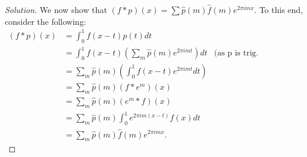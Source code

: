\begin{proof}[Solution]
We now show that  $(f* p) \left( x \right) = \sum \hat{p} \left( m \right) \hat{f}\left( m \right) e^{2\pi i m x}$. To this end, consider the following:
\begin{align*}
\left( f*p \right) \left( x \right) &= \int_{0}^{1} f\left( x-t \right) p\left( t \right) dt \\
&= \int_{0}^{1} f\left( x-t \right) \left( \sum_{m} \hat{p}\left( m \right) e^{2\pi i m t}\right) dt & \text{(as p is trig. polynomial and sum is a finite sum)} \\
&= \sum_{m} \hat{p} \left( m \right)\left( \int_{0}^{1} f\left( x-t \right) e^{2\pi i m t} dt \right) \\
&= \sum_{m} \hat{p} \left( m \right) \left( f * e^{m} \right) (x) \\
&= \sum_{m} \hat{p} \left( m \right) (e^{m} * f)(x) \\
&= \sum_{m} \hat{p}\left( m \right) \int_{0}^{1} e^{2\pi i m \left( x-t \right)} f\left( x \right) dt \\
&= \sum_{m} \hat{p} \left( m \right) \hat{f}\left( m \right) e^{2\pi i m x}.
\end{align*}
\end{proof}

